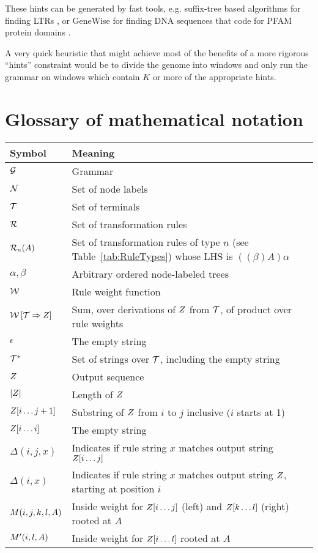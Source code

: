 \documentclass[10pt]{article}
\newcommand{\tabnum}[1]{\ref{tab:#1}}
\newcommand{\tabref}[1]{Table~\tabnum{#1}}
\begin{document}
These hints can be generated by fast tools, e.g. suffix-tree based algorithms for finding LTRs \cite{pmid16819780},
or GeneWise for finding DNA sequences that code for PFAM protein domains \cite{BirneyEtAl04}.

A very quick heuristic that might achieve most of the benefits of a more rigorous ``hints'' constraint
would be to divide the genome into windows and only run the grammar on windows which contain $K$ or more of the appropriate hints.

\section{Glossary of mathematical notation}

\noindent
\begin{tabular}{ll}
Symbol & Meaning \\
\hline
${\cal G}$ & Grammar \\
${\cal N}$ & Set of node labels \\
${\cal T}$ & Set of terminals \\
${\cal R}$ & Set of transformation rules \\
${\cal R}_{n}(A)$ & Set of transformation rules of type $n$ (see \tabref{RuleTypes}) whose LHS is $((\beta)A)\alpha$ \\
$\alpha,\beta$ & Arbitrary ordered node-labeled trees \\
${\cal W}$ & Rule weight function \\
${\cal W} \left[ {\cal T} \Rightarrow {Z} \right]$ & Sum, over derivations of $Z$ from ${\cal T}$, of product over rule weights \\
$\epsilon$ & The empty string \\
${\cal T}^\ast$ & Set of strings over ${\cal T}$, including the empty string \\
$Z$ & Output sequence \\
$|Z|$ & Length of $Z$ \\
$Z[i \ldots j+1]$ & Substring of $Z$ from $i$ to $j$ inclusive ($i$ starts at 1) \\
$Z[i \ldots i]$ & The empty string \\
$\Delta(i,j,x)$ & Indicates if rule string $x$ matches output string $Z[i \ldots j]$ \\
$\Delta(i,x)$ & Indicates if rule string $x$ matches output string $Z$, starting at position $i$ \\
$M(i,j,k,l,A)$ & Inside weight for $Z[i \ldots j]$ (left) and $Z[k \ldots l]$ (right) rooted at $A$ \\
$M'(i,l,A)$ & Inside weight for $Z[i \ldots l]$ rooted at $A$ \\
\end{tabular}
\end{document}
